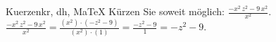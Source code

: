\begin{MAufgabe}{Kuerzen}{kr, dh, MaTeX}
K\"urzen Sie soweit m\"oglich: $\frac{ - x^2\, z^2 - 9\, x^2}{x^2}$.\\ 
\ifLsg\MLoesung
\quad $\frac{ - x^2\, z^2 - 9\, x^2}{x^2}=\frac{(x^2)\cdot( - z^2 - 9)}{(x^2)\cdot(1)}=\frac{ - z^2 - 9}{1}= - z^2 - 9$.\else\relax\fi
 \end{MAufgabe}